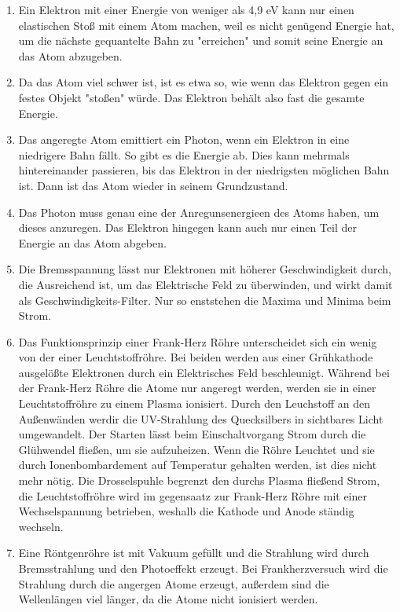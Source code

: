 \documentclass[11pt, a4paper]{article}
\begin{document}
\begin{enumerate}
        \item Ein Elektron mit einer Energie von weniger als 4,9 eV kann nur einen elastischen Stoß mit einem Atom machen, weil es nicht genügend Energie hat, um die nächste gequantelte Bahn zu "erreichen" und somit seine Energie an das Atom abzugeben.
        \item Da das Atom viel schwer ist, ist es etwa so, wie wenn das Elektron gegen ein festes Objekt "stoßen" würde. Das Elektron behält also fast die gesamte Energie.
        \item Das angeregte Atom emittiert ein Photon, wenn ein Elektron in eine niedrigere Bahn fällt. So gibt es die Energie ab. Dies kann mehrmals hintereinander passieren, bis das Elektron in der niedrigsten möglichen Bahn ist. Dann ist das Atom wieder in seinem Grundzustand.
        \item Das Photon muss genau eine der Anregunsenergieen des Atoms haben, um dieses anzuregen. Das Elektron hingegen kann auch nur einen Teil der Energie an das Atom abgeben.
        \item Die Bremsspannung lässt nur Elektronen mit höherer Geschwindigkeit durch, die Ausreichend ist, um das Elektrische Feld zu überwinden, und wirkt damit als Geschwindigkeits-Filter. Nur so enststehen die Maxima und Minima beim Strom.
        \item Das Funktionsprinzip einer Frank-Herz Röhre unterscheidet sich ein wenig von der einer Leuchtstoffröhre. Bei beiden werden aus einer Grühkathode ausgelößte Elektronen durch ein Elektrisches Feld beschleunigt. Während bei der Frank-Herz Röhre die Atome nur angeregt werden, werden sie in einer Leuchtstoffröhre zu einem Plasma ionisiert. Durch den Leuchstoff an den Außenwänden werdir die UV-Strahlung des Quecksilbers in sichtbares Licht umgewandelt. Der Starten lässt beim Einschaltvorgang Strom durch die Glühwendel fließen, um sie aufzuheizen. Wenn die Röhre Leuchtet und sie durch Ionenbombardement auf Temperatur gehalten werden, ist dies nicht mehr nötig. Die Drosselspuhle begrenzt den durchs Plasma fließend Strom, die Leuchtstoffröhre wird im gegensaatz zur Frank-Herz Röhre mit einer Wechselspannung betrieben, weshalb die Kathode und Anode ständig wechseln.
        \item Eine Röntgenröhre ist mit Vakuum gefüllt und die Strahlung wird durch Bremsstrahlung und den Photoeffekt erzeugt. Bei Frankherzversuch wird die Strahlung durch die angergen Atome erzeugt, außerdem sind die Wellenlängen viel länger, da die Atome nicht ionisiert werden. 
        
        
    \end{enumerate}
\end{document}
